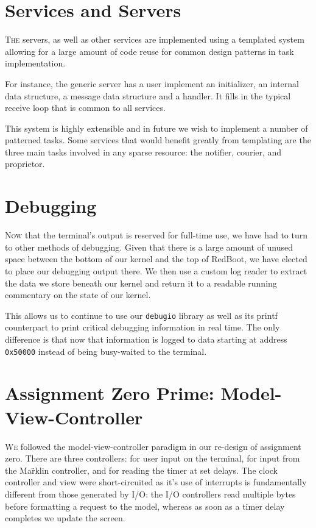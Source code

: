 \documentclass{amsart}
\begin{document}
\section*{Services and Servers}

\textsc{The} servers, as well as other services are implemented using a templated system
allowing for a large amount of code reuse for common design patterns in task
implementation.

For instance, the generic server has a user implement an initializer, an
internal data structure, a message data structure and a handler. It fills in the
typical receive loop that is common to all services.

This system is highly extensible and in future we wish to implement a number of
patterned tasks. Some services that would benefit greatly from templating are
the three main tasks involved in any sparse resource: the notifier, courier, and
proprietor.

\section*{Debugging}

\textsc{Now} that the terminal's output is reserved for full-time use, we have
had to turn to other methods of debugging. Given that there is a large amount of
unused space between the bottom of our kernel and the top of RedBoot, we have
elected to place our debugging output there.  We then use a custom log reader to
extract the data we store beneath our kernel and return it to a readable running
commentary on the state of our kernel.

This allows us to continue to use our \texttt{debugio} library as well as its
printf counterpart to print critical debugging information in real time. The
only difference is that now that information is logged to data starting at
address \texttt{0x50000} instead of being busy-waited to the terminal.

\section*{Assignment Zero Prime: Model-View-Controller}

\textsc{We} followed the model-view-controller paradigm in our re-design of assignment zero. There are three controllers: for user input on the terminal, for input from the Ma\"rklin controller, and for reading the timer at set delays. The clock controller and view were short-circuited as it's use of interrupts is fundamentally different from those generated by I/O: the I/O controllers read multiple bytes before formatting a request to the model, whereas as soon as a timer delay completes we update the screen.
\end{document}
